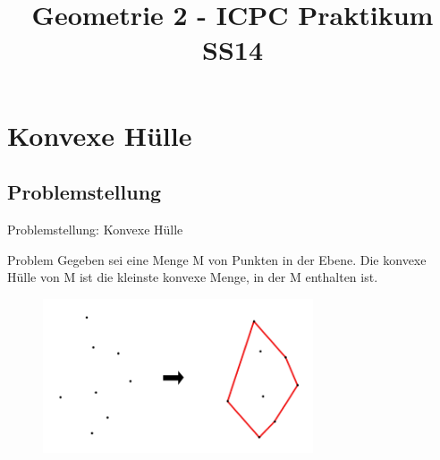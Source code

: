 \documentclass[18pt]{beamer}
\title[Geometrie 2]{Geometrie 2 - ICPC Praktikum SS14}
\institute{Tobias Hornberger $\cdot$ Paul Jungeblut $\cdot$ Lena Winter}
\begin{document}

\begin{frame}
\titlepage
\end{frame}

\section{Konvexe Hülle}
	\subsection{Problemstellung}
		\begin{frame}{Problemstellung: Konvexe Hülle}
			\begin{block}{Problem}
			 Gegeben sei eine Menge M von Punkten in der Ebene. Die konvexe Hülle von M ist die kleinste konvexe Menge, in der M enthalten ist.
			\end{block}
			\begin{figure}
				\includegraphics[width=8cm]{logos/konhu.png}\\
			\end{figure}
		\end{frame}
		
\end{document}
